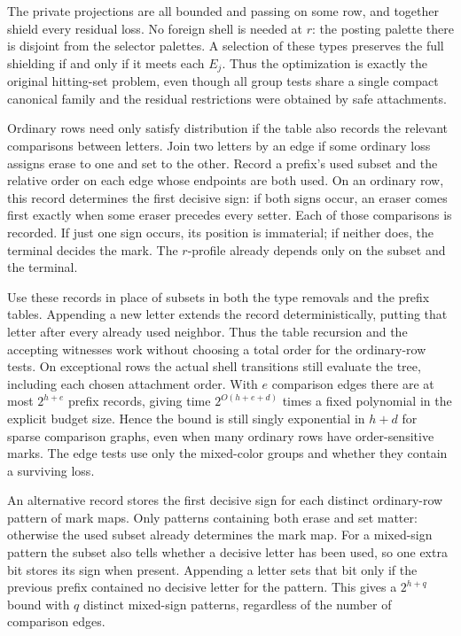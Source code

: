 The private projections are all bounded and passing
on some row, and together shield every residual loss.
No foreign shell is needed at $r$: the posting
palette there is disjoint from the selector palettes.
A selection of these types preserves the full
shielding if and only if it meets each $E_j$.
Thus the optimization is exactly the original
hitting-set problem, even though all group tests
share a single compact canonical family and the
residual restrictions were obtained by safe
attachments.

Ordinary rows need only satisfy distribution if the
table also records the relevant comparisons between
letters. Join two letters by an edge if some ordinary
loss assigns erase to one and set to the other. Record
a prefix's used subset and the relative order on each
edge whose endpoints are both used. On an ordinary
row, this record determines the first decisive sign:
if both signs occur, an eraser comes first exactly
when some eraser precedes every setter. Each of those
comparisons is recorded. If just one sign occurs, its
position is immaterial; if neither does, the terminal
decides the mark. The $r$-profile already depends only
on the subset and the terminal.

Use these records in place of subsets in both the
type removals and the prefix tables. Appending a new
letter extends the record deterministically, putting
that letter after every already used neighbor. Thus
the table recursion and the accepting witnesses work
without choosing a total order for the ordinary-row
tests. On exceptional rows the actual shell transitions
still evaluate the tree, including each chosen
attachment order. With $e$ comparison edges there
are at most $2^{h+e}$ prefix records, giving time
$2^{O(h+e+d)}$ times a fixed polynomial in the
explicit budget size. Hence the bound is still singly
exponential in $h+d$ for sparse comparison graphs,
even when many ordinary rows have order-sensitive marks.
The edge tests use only the mixed-color groups and
whether they contain a surviving loss.

An alternative record stores the first decisive sign
for each distinct ordinary-row pattern of mark maps.
Only patterns containing both erase and set matter:
otherwise the used subset already determines the
mark map. For a mixed-sign pattern the subset also
tells whether a decisive letter has been used, so
one extra bit stores its sign when present. Appending
a letter sets that bit only if the previous prefix
contained no decisive letter for the pattern. This
gives a $2^{h+q}$ bound with $q$ distinct mixed-sign
patterns, regardless of the number of comparison edges.

